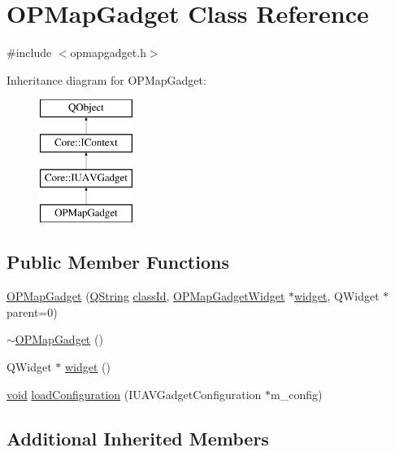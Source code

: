 \hypertarget{class_o_p_map_gadget}{\section{O\-P\-Map\-Gadget Class Reference}
\label{class_o_p_map_gadget}
}


{\ttfamily \#include $<$opmapgadget.\-h$>$}

Inheritance diagram for O\-P\-Map\-Gadget\-:\begin{figure}[H]
\begin{center}
\leavevmode
\includegraphics[height=4.000000cm]{class_o_p_map_gadget}
\end{center}
\end{figure}
\subsection*{Public Member Functions}
\begin{DoxyCompactItemize}
\item 
\hyperlink{group___o_p_map_plugin_ga6782261a51cde76c6b7fd104e0fc8607}{O\-P\-Map\-Gadget} (\hyperlink{group___u_a_v_objects_plugin_gab9d252f49c333c94a72f97ce3105a32d}{Q\-String} \hyperlink{group___core_plugin_ga3878fde66a57220608960bcc3fbeef2c}{class\-Id}, \hyperlink{class_o_p_map_gadget_widget}{O\-P\-Map\-Gadget\-Widget} $\ast$\hyperlink{group___o_p_map_plugin_ga4c0dd792243fff2dc45fd98929145d27}{widget}, Q\-Widget $\ast$parent=0)
\item 
\hyperlink{group___o_p_map_plugin_ga041e6faec573a7770cc9ddfdf8694a5e}{$\sim$\-O\-P\-Map\-Gadget} ()
\item 
Q\-Widget $\ast$ \hyperlink{group___o_p_map_plugin_ga4c0dd792243fff2dc45fd98929145d27}{widget} ()
\item 
\hyperlink{group___u_a_v_objects_plugin_ga444cf2ff3f0ecbe028adce838d373f5c}{void} \hyperlink{group___o_p_map_plugin_ga8a10d4d6d7feb8ab2c2dd928cc46c260}{load\-Configuration} (I\-U\-A\-V\-Gadget\-Configuration $\ast$m\-\_\-config)
\end{DoxyCompactItemize}
\subsection*{Additional Inherited Members}


